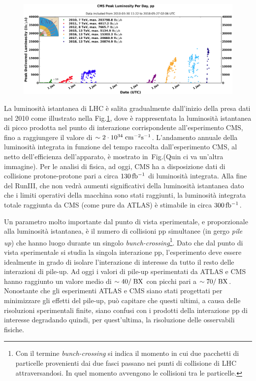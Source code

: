 \begin{figure}
\centering
\includegraphics[width=\textwidth]{Immagini/peak_lumi_ppbis}
\caption{ }
\label{peak_lumi_pp}
\end{figure}
La luminosit\`a istantanea di LHC \`e salita gradualmente dall'inizio della presa dati nel 2010 come illustrato nella Fig.\ref{peak_lumi_pp},
 dove \`e rappresentata la luminosit\`a istantanea di picco prodotta nel punto di interazione corrispondente all'esperimento CMS, fino a raggiungere il valore di $\sim 2\cdot10^{34}\rm \; cm^{-2}{\mathrm s}^{-1}$. L'andamento annuale della luminosit\`a integrata in funzione del tempo raccolta dall'esperimento CMS, al netto dell'efficienza dell'apparato, \`e mostrato in~Fig.(Quin ci va un'altra immagine). Per le analisi di fisica, ad oggi, CMS ha a disposizione dati di collisione protone-protone pari a circa $130{\rm \, fb^{-1}}$ di luminosit\`a integrata. Alla fine del RunIII, che non vedr\`a aumenti significativi della luminosit\`a istantanea dato che i limiti operativi della macchina sono stati raggiunti, la luminosit\`a integrata totale raggiunta da CMS (come pure da ATLAS) \`e stimabile in circa $300{\rm \, fb^{-1}}$.

Un parametro molto importante dal punto di vista sperimentale, e proporzionale alla luminosità istantanea, \`e il numero di collisioni pp simultanee (in gergo {\em pile up}) che hanno luogo durante un singolo \textit{bunch-crossing}\footnote{Con il termine \textit{bunch-crossing} si indica il momento in cui due pacchetti di particelle provenienti dai due fasci passano nei punti di collisione di LHC attraversandosi. In quel momento avvengono le collisioni tra le particelle.}. Dato che dal punto di vista sperimentale si studia la singola interazione pp, l'esperimento deve essere idealmente in grado di isolare l'interazione di interesse da tutto il resto delle interazioni di pile-up. Ad oggi i valori di pile-up sperimentati da ATLAS e CMS hanno raggiunto un valore medio di $\sim 40/\rm \; BX$ con picchi pari a $\sim 70/\rm \; BX$. Nonostante che gli esperimenti ATLAS e CMS siano stati progettati per minimizzare gli effetti del pile-up, può capitare che questi ultimi, a causa delle risoluzioni sperimentali finite, siano confusi con i prodotti della interazione pp di interesse degradando quindi, per quest'ultima, la risoluzione delle osservabili fisiche.



